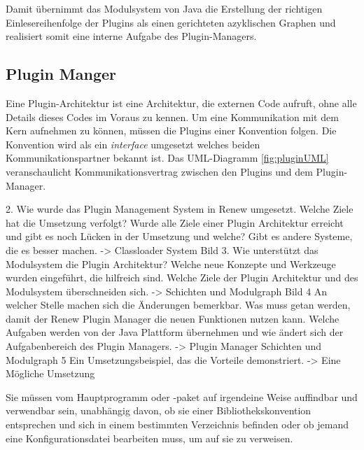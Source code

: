 		Damit übernimmt das Modulsystem von Java die Erstellung der richtigen Einlesereihenfolge der Plugins als einen gerichteten azyklischen Graphen und realisiert somit eine interne Aufgabe des Plugin-Managers.


	\subsection{Plugin Manger }\label{sub:module_layer}
		Eine Plugin-Architektur ist eine Architektur, die externen Code aufruft, ohne alle Details dieses Codes im Voraus zu kennen. Um eine Kommunikation mit dem Kern aufnehmen zu können, müssen die Plugins einer Konvention folgen. Die Konvention wird als ein \textit{interface} umgesetzt welches beiden Kommunikationspartner bekannt ist. Das UML-Diagramm \ref{fig:pluginUML} veranschaulicht Kommunikationsvertrag zwischen den Plugins und dem Plugin-Manager. \newline

			2.	Wie wurde das Plugin Management System in Renew umgesetzt. Welche Ziele hat die Umsetzung verfolgt? Wurde alle Ziele einer Plugin Architektur erreicht und gibt es noch Lücken in der Umsetzung und welche? Gibt es andere Systeme, die es besser machen. 
			-> Classloader System Bild 
			3.	Wie unterstützt das Modulsystem die Plugin Architektur? Welche neue Konzepte und Werkzeuge wurden eingeführt, die hilfreich sind. Welche Ziele der Plugin Architektur und des Modulsystem überschneiden sich.
			-> Schichten und Modulgraph Bild 
			4	An welcher Stelle machen sich die Änderungen bemerkbar. Was muss getan werden, damit der Renew Plugin Manager die neuen Funktionen nutzen kann. Welche Aufgaben werden von der Java Plattform übernehmen und wie ändert sich  der Aufgabenbereich des Plugin Managers. 
			->  Plugin Manager Schichten und Modulgraph 
			5	Ein Umsetzungsbeispiel, das die Vorteile demonstriert. 
			-> Eine Mögliche Umsetzung 





Sie müssen vom Hauptprogramm oder -paket auf irgendeine Weise auffindbar und verwendbar sein, unabhängig davon, ob sie einer Bibliothekskonvention entsprechen und sich in einem bestimmten Verzeichnis befinden oder ob jemand eine Konfigurationsdatei bearbeiten muss, um auf sie zu verweisen.


